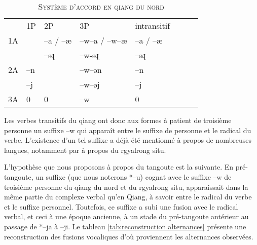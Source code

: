 \documentclass[oldfontcommands,twoside,a4paper,11pt,draft]{memoir}
\newcommand{\ipapl}[1]{{\phondroit #1}}
\newcommand{\captionb}[1]{\caption{\textsc{#1}}}
\begin{document}
\begin{table}
\captionb{Système d'accord en qiang du nord}\label{tab:qiang.accord}
\begin{tabular}{llllllll} \toprule
& 1P & 2P & 3P & intransitif\\
1A &\cellcolor{lightgray} & --a / --æ & --w--a / --w--æ &--a / --æ \\
 & \cellcolor{lightgray}&--\ipapl{əɻ} & --w-\ipapl{əɻ} &--\ipapl{əɻ} \\
2A& --n &\cellcolor{lightgray} & --w--\ipapl{ən} & --n\\
& --j &\cellcolor{lightgray}& --w--\ipapl{əj} & --j\\
3A &0 &0&--w & 0 \\
\bottomrule
\end{tabular}
\end{table}
Les verbes transitifs du qiang ont donc aux formes à patient de troisième personne un suffixe --w qui apparaît entre le suffixe de personne et le radical du verbe. L'existence d'un tel suffixe a déjà été mentionné à propos de nombreuses langues, notamment par \citet{delancey81direction} à propos du rgyalrong situ.

L'hypothèse que nous proposons à propos du tangoute est la suivante. En pré-tangoute, un suffixe (que nous noterons *--u) cognat avec le suffixe --w de troisième personne du qiang du nord et du rgyalrong situ, apparaissait dans la même partie du complexe verbal qu'en Qiang, à savoir entre le radical du verbe et le suffixe personnel. Toutefois, ce suffixe a subi une fusion avec le radical verbal, et ceci à une époque ancienne, à un stade du pré-tangoute antérieur au passage de *--ja à --ji. Le tableau \ref{tab:reconstruction.alternances} présente une reconstruction des fusions vocaliques d'où proviennent les alternances observées.
\end{document}
